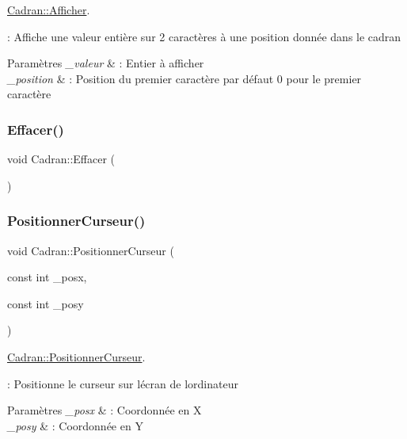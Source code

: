 \hyperlink{class_cadran_a3cbd2586cd8c0a0b52f4a0558f1a32a1}{Cadran\+::\+Afficher}. 

\+: Affiche une valeur entière sur 2 caractères à une position donnée dans le cadran 
\begin{DoxyParams}{Paramètres}
{\em \+\_\+valeur} & \+: Entier à afficher \\
\hline
{\em \+\_\+position} & \+: Position du premier caractère par défaut 0 pour le premier caractère \\
\hline
\end{DoxyParams}
\mbox{\label{class_cadran_ae0241c088e1b351fb8bcbd2c6436cac9}} 
\subsubsection{\texorpdfstring{Effacer()}{Effacer()}}
{\footnotesize\ttfamily void Cadran\+::\+Effacer (\begin{DoxyParamCaption}{ }\end{DoxyParamCaption})}

\mbox{\label{class_cadran_aad5b68b6c93bfba09b0903eb7faacc9b}} 
\subsubsection{\texorpdfstring{Positionner\+Curseur()}{PositionnerCurseur()}}
{\footnotesize\ttfamily void Cadran\+::\+Positionner\+Curseur (\begin{DoxyParamCaption}\item[{const int}]{\+\_\+posx,  }\item[{const int}]{\+\_\+posy }\end{DoxyParamCaption})\hspace{0.3cm}{\ttfamily [private]}}



\hyperlink{class_cadran_aad5b68b6c93bfba09b0903eb7faacc9b}{Cadran\+::\+Positionner\+Curseur}. 

\+: Positionne le curseur sur l\textquotesingle{}écran de l\textquotesingle{}ordinateur 
\begin{DoxyParams}{Paramètres}
{\em \+\_\+posx} & \+: Coordonnée en X \\
\hline
{\em \+\_\+posy} & \+: Coordonnée en Y \\
\hline
\end{DoxyParams}


